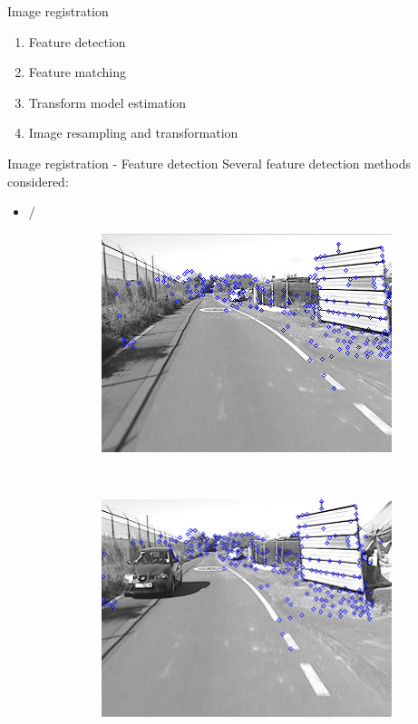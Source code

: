 \begin{frame}{Image registration}
  \begin{enumerate}
    \item Feature detection
    \item Feature matching
    \item Transform model estimation
    \item Image resampling and transformation
  \end{enumerate}

  \note {
  
  }
\end{frame}

\begin{frame}{Image registration - Feature detection}
  Several feature detection methods considered:
  \begin{itemize}
    \item \cite{harris1988combined} / \cite{shi1994good}\\
    \begin{center}
      \begin{figure}[h!]
	\centering
	\begin{subfigure}[b]{0.45\textwidth}
		\includegraphics[height=0.3\textheight]{featuresShi1}
	\end{subfigure}%
	~
	\begin{subfigure}[b]{0.45\textwidth}
		\includegraphics[height=0.3\textheight]{featuresShi2}

\end{subfigure}
\end{figure}
\end{center}
\end{itemize}
\end{frame}
